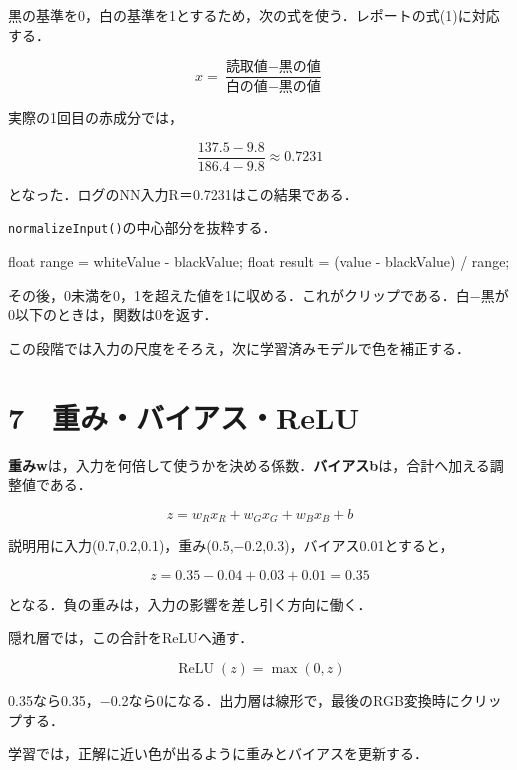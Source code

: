 \documentclass[
  14pt,
  a5paper,
]{extarticle}
\newenvironment{Shaded}{}{}
\newcommand{\DataTypeTok}[1]{\textcolor[rgb]{0.56,0.13,0.00}{#1}}
\newcommand{\NormalTok}[1]{#1}
\newcommand{\OperatorTok}[1]{\textcolor[rgb]{0.40,0.40,0.40}{#1}}
\begin{document}
黒の基準を0，白の基準を1とするため，次の式を使う．レポートの式(1)に対応する．

\[x=\frac{\text{読取値}-\text{黒の値}}{\text{白の値}-\text{黒の値}}\]

実際の1回目の赤成分では，

\[\frac{137.5-9.8}{186.4-9.8}\approx0.7231\]

となった．ログのNN入力R＝0.7231はこの結果である．

\texttt{normalizeInput()}の中心部分を抜粋する．

\begin{Shaded}
\begin{Highlighting}[]
\DataTypeTok{float}\NormalTok{ range }\OperatorTok{=}
\NormalTok{  whiteValue }\OperatorTok{{-}}\NormalTok{ blackValue}\OperatorTok{;}
\DataTypeTok{float}\NormalTok{ result }\OperatorTok{=}
  \OperatorTok{(}\NormalTok{value }\OperatorTok{{-}}\NormalTok{ blackValue}\OperatorTok{)}
  \OperatorTok{/}\NormalTok{ range}\OperatorTok{;}
\end{Highlighting}
\end{Shaded}

その後，0未満を0，1を超えた値を1に収める．これがクリップである．白−黒が0以下のときは，関数は0を返す．

この段階では入力の尺度をそろえ，次に学習済みモデルで色を補正する．

\newpage

\section{7　重み・バイアス・ReLU}\label{ux91cdux307fux30d0ux30a4ux30a2ux30b9relu}

\textbf{重みw}は，入力を何倍して使うかを決める係数．\textbf{バイアスb}は，合計へ加える調整値である．

\[z=w_Rx_R+w_Gx_G+w_Bx_B+b\]

説明用に入力(0.7,0.2,0.1)，重み(0.5,−0.2,0.3)，バイアス0.01とすると，

\[z=0.35-0.04+0.03+0.01=0.35\]

となる．負の重みは，入力の影響を差し引く方向に働く．

隠れ層では，この合計をReLUへ通す．

\[\operatorname{ReLU}(z)=\max(0,z)\]

0.35なら0.35，−0.2なら0になる．出力層は線形で，最後のRGB変換時にクリップする．

学習では，正解に近い色が出るように重みとバイアスを更新する．
\end{document}
